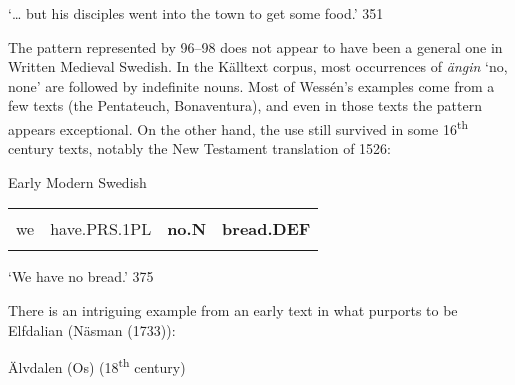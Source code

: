 \begin{styleTranslation}
‘… but his disciples went into the town to get some food.’ 351

\end{styleTranslation}

\begin{styleBodyTextFirst}
The pattern represented by 96–98 does not appear to have been a general one in Written Medieval Swedish. In the Källtext corpus, most occurrences of \textit{ängin} ‘no, none’ are followed by indefinite nouns. Most of Wessén’s examples come from a few texts (the Pentateuch, Bonaventura), and even in those texts the pattern appears exceptional. On the other hand, the use still survived in some 16\textsuperscript{th} century texts, notably the New Testament translation of 1526:

\end{styleBodyTextFirst}

\begin{listWWNumileveli}
\item 

\begin{styleExample}
Early Modern Swedish

\end{styleExample}

\end{listWWNumileveli}

\begin{tabular}{llll}
\lsptoprule
\multicolumn{4}{l}{Wij

}\\
we & have.PRS.1PL & {\bfseries no.N} & {\bfseries bread.DEF}\\
\lspbottomrule
\end{tabular}

\begin{styleTranslation}
‘We have no bread.’ 375

\end{styleTranslation}

\begin{styleBodyTextFirst}
There is an intriguing example from an early text in what purports to be Elfdalian (Näsman (1733)):

\end{styleBodyTextFirst}

\begin{listWWNumileveli}
\item 

\begin{styleExample}
\label{bkm:Ref108604709}Älvdalen (Os) (18\textsuperscript{th} century)

\end{styleExample}

\end{listWWNumileveli}

